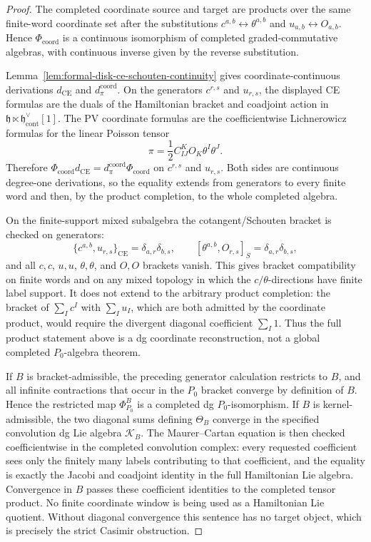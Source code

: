 \begin{proof}
	  The completed coordinate source and target are products over the same
	  finite-word coordinate set after the substitutions
		  \(c^{a,b}\leftrightarrow\theta^{a,b}\) and
		  \(u_{a,b}\leftrightarrow O_{a,b}\).  Hence
	  \(\Phi_{\mathrm{coord}}\) is a continuous
  isomorphism of completed graded-commutative algebras, with continuous
  inverse given by the reverse substitution.

  Lemma~\ref{lem:formal-disk-ce-schouten-continuity} gives
  coordinate-continuous
  derivations \(d_{\mathrm{CE}}\) and \(d_\pi^{\mathrm{coord}}\).  On the generators
  \(c^{r,s}\) and \(u_{r,s}\), the displayed CE formulas are the duals
  of the Hamiltonian bracket and coadjoint action in
  \(\mathfrak h\ltimes\mathfrak h^\vee_{\mathrm{cont}}[1]\).  The
  PV coordinate formulas are the coefficientwise Lichnerowicz formulas
  for the linear Poisson tensor
  \[
    \pi=\frac12 C^K_{IJ}O_K\theta^I\theta^J .
  \]
	  Therefore \(\Phi_{\mathrm{coord}} d_{\mathrm{CE}}=d_\pi^{\mathrm{coord}}\Phi_{\mathrm{coord}}\) on \(c^{r,s}\) and
	  \(u_{r,s}\).  Both sides are continuous degree-one derivations, so the
  equality extends from generators to every finite word and then, by the
  product completion, to the whole completed algebra.

	  On the finite-support mixed subalgebra the cotangent/Schouten bracket is
  checked on generators:
  \[
    \{c^{a,b},u_{r,s}\}_{\mathrm{CE}}
      =\delta_{a,r}\delta_{b,s},
    \qquad
    [\theta^{a,b},O_{r,s}]_S
      =\delta_{a,r}\delta_{b,s},
  \]
  and all \(c,c\), \(u,u\), \(\theta,\theta\), and \(O,O\) brackets
  vanish.  This gives bracket compatibility on finite words and on any
  mixed topology in which the \(c/\theta\)-directions have finite label
  support.  It does not extend to the arbitrary product completion: the
  bracket of \(\sum_I c^I\) with \(\sum_I u_I\), which are both admitted
  by the coordinate product, would require the divergent diagonal
  coefficient \(\sum_I1\).  Thus the full product statement above is a
	  dg coordinate reconstruction, not a global completed \(P_0\)-algebra
	  theorem.

	  If \(B\) is bracket-admissible, the preceding generator calculation
	  restricts to \(B\), and all infinite contractions that occur in the
	  \(P_0\) bracket converge by definition of \(B\).  Hence the restricted
	  map \(\Phi^B_{P_0}\) is a completed dg \(P_0\)-isomorphism.  If \(B\)
	  is kernel-admissible, the two diagonal sums defining \(\Theta_B\)
	  converge in the specified convolution dg Lie algebra \(\mathcal K_B\).
	  The Maurer--Cartan equation is
	  then checked coefficientwise in the completed convolution complex:
	  every requested coefficient sees only the finitely many labels
	  contributing to that coefficient, and the equality is exactly the
	  Jacobi and coadjoint identity in the full Hamiltonian Lie algebra.
	  Convergence in \(B\) passes these coefficient identities to the
	  completed tensor product.  No finite coordinate window is being used
	  as a Hamiltonian Lie quotient.  Without diagonal
	  convergence this sentence has no target object, which is precisely the
	  strict Casimir obstruction.


\end{proof}
